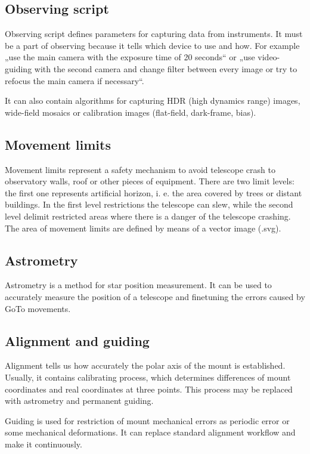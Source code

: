 \documentclass{ibws_template}
\begin{document}
\subsection{Observing script}
Observing script defines parameters for capturing data from instruments. It must be a part of observing because it tells which device to use and how. For example „use the main camera with the exposure time of 20 seconds“ or „use video-guiding with the second camera and change filter between every image or try to refocus the main camera if necessary“.

It can also contain algorithms for capturing HDR (high dynamics range) images, wide-field mosaics or calibration images (flat-field, dark-frame, bias).


\subsection{Movement limits}
Movement limits represent a safety mechanism to avoid telescope crash to observatory walls, roof or other pieces of equipment. There are two limit levels: the first one represents artificial horizon, i. e. the area covered by trees or distant buildings. In the first level restrictions the telescope can slew, while the second level delimit restricted areas where there is a danger of the telescope crashing. The area of movement limits are defined by means of a vector image (.svg).

\subsection{Astrometry}
Astrometry is a method for star position measurement. It can be used to accurately measure the position of a telescope and finetuning the errors caused by GoTo movements.


\subsection{Alignment and guiding}
Alignment tells us how accurately the polar axis of the mount is established. Usually, it contains calibrating process, which determines differences of mount coordinates and real coordinates at three points. This process may be replaced with astrometry and permanent guiding.

Guiding is used for restriction of mount mechanical errors as periodic error or some mechanical deformations. It can replace standard alignment workflow and make it continuously.
\end{document}

